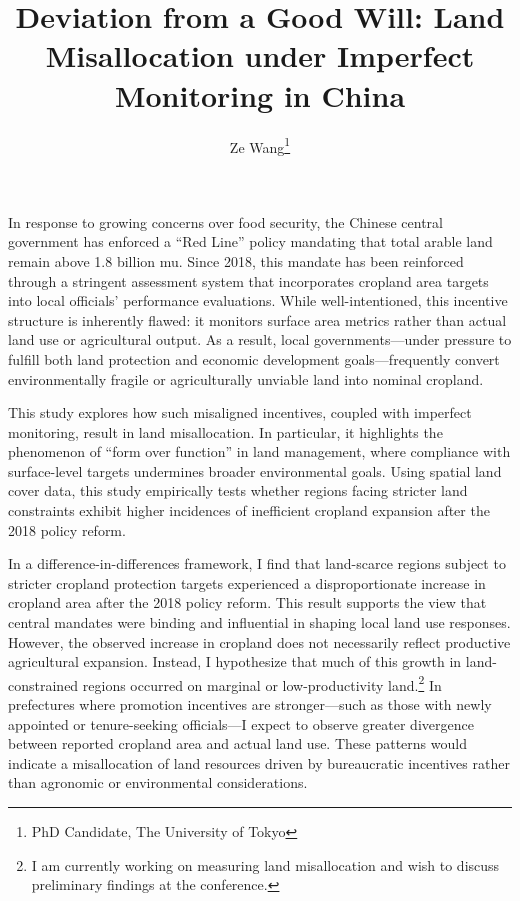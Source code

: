 \documentclass[12pt]{article}  %
\title{Deviation from a Good Will: Land Misallocation under Imperfect Monitoring in China}
\author{Ze Wang\thanks{PhD Candidate, The University of Tokyo}}
\makeatletter
\renewcommand{\maketitle}{
  \begin{center}
    {\Large \@title \par}
    \vspace{0.3em}  %
    {\normalsize \@author \par}
    \@thanks  %
  \end{center}
}
\makeatother
\begin{document}
\maketitle



In response to growing concerns over food security, the Chinese central government has enforced a “Red Line” policy mandating that total arable land remain above 1.8 billion mu. Since 2018, this mandate has been reinforced through a stringent assessment system that incorporates cropland area targets into local officials’ performance evaluations. While well-intentioned, this incentive structure is inherently flawed: it monitors surface area metrics rather than actual land use or agricultural output. As a result, local governments—under pressure to fulfill both land protection and economic development goals—frequently convert environmentally fragile or agriculturally unviable land into nominal cropland.

This study explores how such misaligned incentives, coupled with imperfect monitoring, result in land misallocation. In particular, it highlights the phenomenon of “form over function” in land management, where compliance with surface-level targets undermines broader environmental goals. Using spatial land cover data, this study empirically tests whether regions facing stricter land constraints exhibit higher incidences of inefficient cropland expansion after the 2018 policy reform.

In a difference-in-differences framework, I find that land-scarce regions subject to stricter cropland protection targets experienced a disproportionate increase in cropland area after the 2018 policy reform. This result supports the view that central mandates were binding and influential in shaping local land use responses. However, the observed increase in cropland does not necessarily reflect productive agricultural expansion. Instead, I hypothesize that much of this growth in land-constrained regions occurred on marginal or low-productivity land.\footnote{I am currently working on measuring land misallocation and wish to discuss preliminary findings at the conference.} In prefectures where promotion incentives are stronger---such as those with newly appointed or tenure-seeking officials---I expect to observe greater divergence between reported cropland area and actual land use. These patterns would indicate a misallocation of land resources driven by bureaucratic incentives rather than agronomic or environmental considerations.
\end{document}
